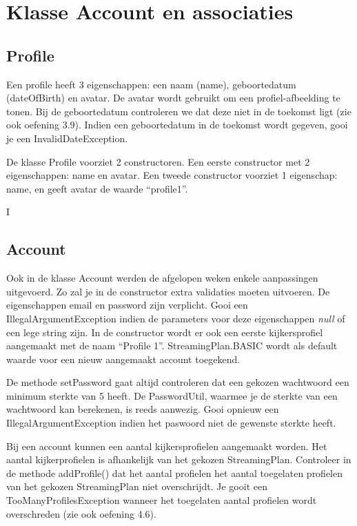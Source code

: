 \documentclass{tstextbook}
\begin{document}
\section{Klasse Account en associaties}



\subsection{Profile}

Een profile heeft 3 eigenschappen: een naam (name), geboortedatum (dateOfBirth) en avatar. De avatar wordt gebruikt om een profiel-afbeelding te tonen. Bij de geboortedatum controleren we dat deze niet in de toekomst ligt (zie ook oefening 3.9).
Indien een geboortedatum in de toekomst wordt gegeven, gooi je een InvalidDateException.

De klasse Profile voorziet 2 constructoren. Een eerste constructor met 2 eigenschappen: name en avatar. Een tweede constructor voorziet 1 eigenschap: name, en geeft avatar de waarde ``profile1''.

I

\subsection{Account}

Ook in de klasse Account werden de afgelopen weken enkele aanpassingen uitgevoerd. Zo zal je in de constructor extra validaties moeten uitvoeren. De eigenschappen email en password zijn verplicht. Gooi een IllegalArgumentException indien de parameters voor deze eigenschappen \textit{null} of een lege string zijn. In de constructor wordt er ook een eerste kijkersprofiel aangemaakt met de naam ``Profile 1''.
StreamingPlan.BASIC wordt als default waarde voor een nieuw aangemaakt account toegekend. 

De methode setPassword gaat altijd controleren dat een gekozen wachtwoord een minimum sterkte van 5 heeft. De PasswordUtil, waarmee je de sterkte van een wachtwoord kan berekenen, is reeds aanwezig. Gooi opnieuw een IllegalArgumentException indien het paswoord niet de gewenste sterkte heeft.

Bij een account kunnen een aantal kijkersprofielen aangemaakt worden. Het aantal kijkerprofielen is afhankelijk van het gekozen StreamingPlan. Controleer in de methode addProfile() dat het aantal profielen het aantal toegelaten profielen van het gekozen StreamingPlan niet overschrijdt.
Je gooit een TooManyProfilesException wanneer het toegelaten aantal profielen wordt overschreden (zie ook oefening 4.6).
\end{document}
